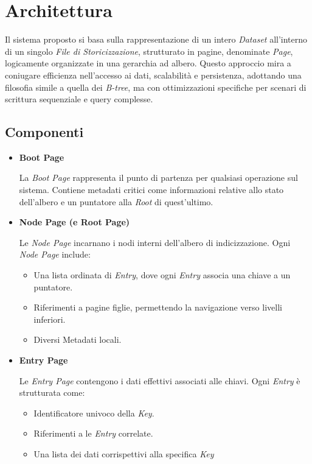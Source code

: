 \documentclass[12pt,a4paper,openright,twoside]{book}
\begin{document}
    \section{Architettura}

        Il sistema proposto si basa sulla rappresentazione di un intero \textit{Dataset} all’interno di un singolo \textit{File di Storicizzazione}, strutturato in pagine, denominate \textit{Page}, logicamente organizzate in una gerarchia ad albero. Questo approccio mira a coniugare efficienza nell’accesso ai dati, scalabilità e persistenza, adottando una filosofia simile a quella dei \textit{B-tree}, ma con ottimizzazioni specifiche per scenari di scrittura sequenziale e query complesse.

        \subsection{Componenti}

            \begin{itemize}
                \item \textbf{Boot Page}

                La \textit{Boot Page} rappresenta il punto di partenza per qualsiasi operazione sul sistema. Contiene metadati critici come informazioni relative allo stato dell'albero e un puntatore alla \textit{Root} di quest'ultimo.

                \pagebreak

                \item \textbf{Node Page (e Root Page)}

                Le \textit{Node Page} incarnano i nodi interni dell’albero di indicizzazione.
                Ogni \textit{Node Page} include:
                \begin{itemize}
                    \item Una lista ordinata di \textit{Entry}, dove ogni \textit{Entry} associa una chiave a un puntatore.
                    \item Riferimenti a pagine figlie, permettendo la navigazione verso livelli inferiori.
                    \item Diversi Metadati locali.
                \end{itemize}

                \item \textbf{Entry Page}

                Le \textit{Entry Page} contengono i dati effettivi associati alle chiavi. Ogni \textit{Entry} è strutturata come:
                \begin{itemize}
                    \item Identificatore univoco della \textit{Key}.
                    \item Riferimenti a le \textit{Entry} correlate.
                    \item Una lista dei dati corrispettivi alla specifica \textit{Key}
                \end{itemize}
            \end{itemize}
\end{document}
